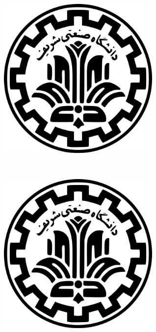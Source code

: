 \thispagestyle{first}
\begin{mdframed}
\begin{minipage}[t]{0.2\textwidth}
	\centering
	\includegraphics[width=0.6\textwidth]{sharif} \\
	\homeworkName
\end{minipage}%
\begin{minipage}[b]{0.59\textwidth}
	\centering
	\courseName \\
	\courseSemester
\end{minipage}%
\begin{minipage}[t]{0.2\textwidth}
	\centering
	\includegraphics[width=0.6\textwidth]{sharif} \\
	\homeworkDue
\end{minipage}%
\end{mdframed}
